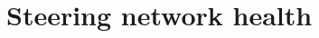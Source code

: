 \documentclass[twocolumn]{article}
\begin{document}
\section{Steering network health}


\end{document}
